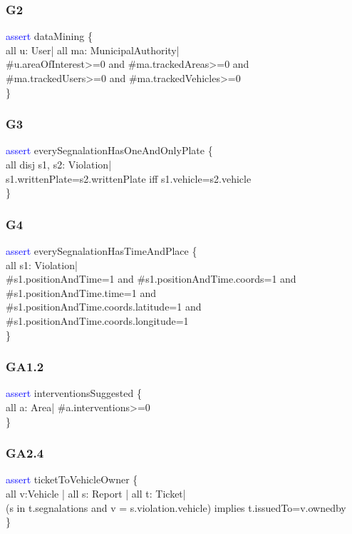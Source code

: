 \subsubsection{G2}
\textcolor{blue}{assert}
\textcolor{mycolor}{dataMining} \{\\
all u: User| all ma: MunicipalAuthority|\\
\#u.areaOfInterest>=0 and \#ma.trackedAreas>=0 and\\ \#ma.trackedUsers>=0 and \#ma.trackedVehicles>=0\\
\}\\
\subsubsection{G3}
\textcolor{blue}{assert}
\textcolor{mycolor}{everySegnalationHasOneAndOnlyPlate} \{\\
    all disj s1, s2: Violation|\\
s1.writtenPlate=s2.writtenPlate iff s1.vehicle=s2.vehicle\\
\}\\
\subsubsection{G4}
\textcolor{blue}{assert}
\textcolor{mycolor}{everySegnalationHasTimeAndPlace} \{\\
all s1: Violation|\\
\#s1.positionAndTime=1 and \#s1.positionAndTime.coords=1 and \#s1.positionAndTime.time=1 and\\ 
\#s1.positionAndTime.coords.latitude=1 and \#s1.positionAndTime.coords.longitude=1\\
\}\\
\subsubsection{GA1.2}
\textcolor{blue}{assert}
\textcolor{mycolor}{interventionsSuggested} \{\\
all a: Area| \#a.interventions>=0\\
\}\\
\subsubsection{GA2.4}
\textcolor{blue}{assert}
\textcolor{mycolor}{ticketToVehicleOwner} \{\\
all v:Vehicle | all s: Report | all t: Ticket|\\
(s in t.segnalations and v = s.violation.vehicle) implies t.issuedTo=v.ownedby\\
\}\\
\\

